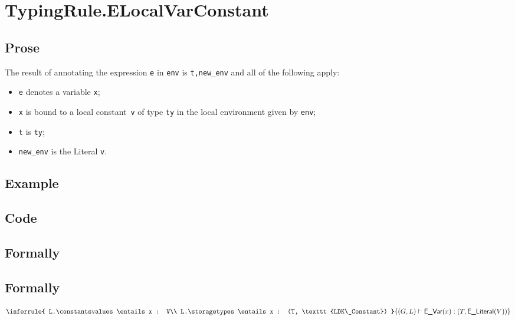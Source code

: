 \documentclass{book}
\newcommand\eliteral[1]{\textsf{E\_Literal}(#1)}
\begin{document}

\section{TypingRule.ELocalVarConstant \label{sec:TypingRule.ELocalVarConstant}}

  \subsection{Prose}
  The result of annotating the expression \texttt{e} in \texttt{env} is
\texttt{t,new\_env} and all of the following apply:  
  \begin{itemize}
  \item \texttt{e} denotes a variable \texttt{x};
  \item \texttt{x} is bound to a local constant~\texttt{v} of type \texttt{ty} in the local environment given by \texttt{env};
  \item \texttt{t} is \texttt{ty};
  \item \texttt{new\_env} is the Literal \texttt{v}.
  \end{itemize}

  \subsection{Example}

  \subsection{Code}

\begin{emptyformal}
  \subsection{Formally}
  \subsection{Formally}
\[
\inferrule{
  L.\constantsvalues \entails x : V\\
  L.\storagetypes \entails x : (T, \texttt{LDK\_Constant})
  }
{(G,L) \entails \evar(x) : (T, \eliteral{V})}
\]
\end{emptyformal}
\end{document}
